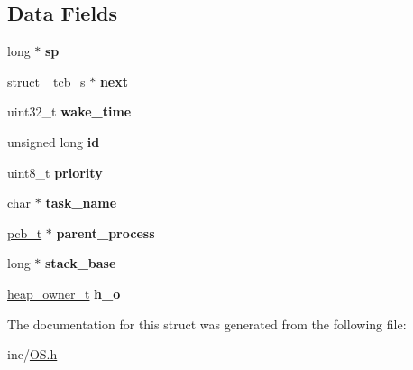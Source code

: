 \subsection*{Data Fields}
\begin{DoxyCompactItemize}
\item 
long $\ast$ {\bfseries sp}\hypertarget{struct__tcb__s_a13f117347df648dbca66e6cbb97a4e0f}{}\label{struct__tcb__s_a13f117347df648dbca66e6cbb97a4e0f}

\item 
struct \hyperlink{struct__tcb__s}{\+\_\+tcb\+\_\+s} $\ast$ {\bfseries next}\hypertarget{struct__tcb__s_af53c260a7b65e7244f809cda9ebb835f}{}\label{struct__tcb__s_af53c260a7b65e7244f809cda9ebb835f}

\item 
uint32\+\_\+t {\bfseries wake\+\_\+time}\hypertarget{struct__tcb__s_a442099ddd859c3f33981828aeef085fe}{}\label{struct__tcb__s_a442099ddd859c3f33981828aeef085fe}

\item 
unsigned long {\bfseries id}\hypertarget{struct__tcb__s_a48e677e5c96cf412d20854802271b9b4}{}\label{struct__tcb__s_a48e677e5c96cf412d20854802271b9b4}

\item 
uint8\+\_\+t {\bfseries priority}\hypertarget{struct__tcb__s_a319151d52db9a3fb0b3c018bce9fcb4a}{}\label{struct__tcb__s_a319151d52db9a3fb0b3c018bce9fcb4a}

\item 
char $\ast$ {\bfseries task\+\_\+name}\hypertarget{struct__tcb__s_a66241e192445da72f98da4e2d1359d5a}{}\label{struct__tcb__s_a66241e192445da72f98da4e2d1359d5a}

\item 
\hyperlink{struct__pcb__s}{pcb\+\_\+t} $\ast$ {\bfseries parent\+\_\+process}\hypertarget{struct__tcb__s_a95f1ceb9227ec81f5fee8d419e38f6f5}{}\label{struct__tcb__s_a95f1ceb9227ec81f5fee8d419e38f6f5}

\item 
long $\ast$ {\bfseries stack\+\_\+base}\hypertarget{struct__tcb__s_a974ef07841ffeb40d1557f239d48c42f}{}\label{struct__tcb__s_a974ef07841ffeb40d1557f239d48c42f}

\item 
\hyperlink{struct__heap__owner__s}{heap\+\_\+owner\+\_\+t} {\bfseries h\+\_\+o}\hypertarget{struct__tcb__s_a3ff5fee4d259b1e8770c961ae8badf6e}{}\label{struct__tcb__s_a3ff5fee4d259b1e8770c961ae8badf6e}

\end{DoxyCompactItemize}


The documentation for this struct was generated from the following file\+:\begin{DoxyCompactItemize}
\item 
inc/\hyperlink{OS_8h}{O\+S.\+h}\end{DoxyCompactItemize}
